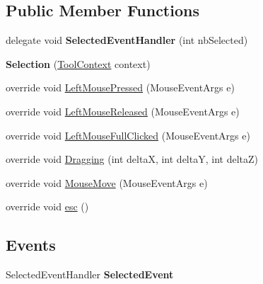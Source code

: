 \subsection*{Public Member Functions}
\begin{DoxyCompactItemize}
\item 
\hypertarget{class_interface_graphique_1_1_tools_1_1_selection_ad4434ee0c7fcc7944d17043745522582}{}delegate void {\bfseries Selected\+Event\+Handler} (int nb\+Selected)\label{class_interface_graphique_1_1_tools_1_1_selection_ad4434ee0c7fcc7944d17043745522582}

\item 
\hypertarget{class_interface_graphique_1_1_tools_1_1_selection_a3d0221ef021627d29bb02cc8ae28653a}{}{\bfseries Selection} (\hyperlink{class_interface_graphique_1_1_tools_1_1_tool_context}{Tool\+Context} context)\label{class_interface_graphique_1_1_tools_1_1_selection_a3d0221ef021627d29bb02cc8ae28653a}

\item 
override void \hyperlink{class_interface_graphique_1_1_tools_1_1_selection_acd046c5e27da4c8b720816a23aa72ff7}{Left\+Mouse\+Pressed} (Mouse\+Event\+Args e)
\item 
override void \hyperlink{class_interface_graphique_1_1_tools_1_1_selection_af1083f7026a963a718a9835e79e541b3}{Left\+Mouse\+Released} (Mouse\+Event\+Args e)
\item 
override void \hyperlink{class_interface_graphique_1_1_tools_1_1_selection_aef3afc03446b9419f0e664ac541b15de}{Left\+Mouse\+Full\+Clicked} (Mouse\+Event\+Args e)
\item 
override void \hyperlink{class_interface_graphique_1_1_tools_1_1_selection_ab88a610b3d7e5fb3e37386e0553ee30a}{Dragging} (int delta\+X, int delta\+Y, int delta\+Z)
\item 
override void \hyperlink{class_interface_graphique_1_1_tools_1_1_selection_a1b44917e1b656fcebe00ce72c77dbc65}{Mouse\+Move} (Mouse\+Event\+Args e)
\item 
override void \hyperlink{class_interface_graphique_1_1_tools_1_1_selection_ab825bb5bc10507fa0e3c653f9d0ce193}{esc} ()
\end{DoxyCompactItemize}
\subsection*{Events}
\begin{DoxyCompactItemize}
\item 
\hypertarget{class_interface_graphique_1_1_tools_1_1_selection_a71b1b4a61b8380c2a788ed8cb816fd61}{}Selected\+Event\+Handler {\bfseries Selected\+Event}\label{class_interface_graphique_1_1_tools_1_1_selection_a71b1b4a61b8380c2a788ed8cb816fd61}

\end{DoxyCompactItemize}


